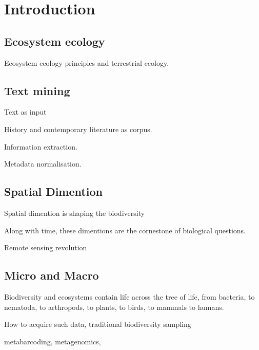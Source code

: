% 
% 


\chapter{Introduction}
\label{cha:intro}



\section{Ecosystem ecology}
\label{sec:intro-ecosystem}

Ecosystem ecology principles \citep{Chapin_Matson_Vitousek_2011} and terrestrial
ecology. 

\section{Text mining}
\label{sec:text-mining}

Text as input

History and contemporary literature as corpus. 

Information extraction. 

Metadata normalisation.



\section{Spatial Dimention}
\label{sec:crete-spatial}

Spatial dimention is shaping the biodiversity

Along with time, these dimentions are the cornestone of 
biological questions. 


Remote sensing revolution

\section{Micro and Macro}
\label{sec:crete-micro-macro}

Biodiversity and ecosystems contain life across the tree of life, from
bacteria, to nematoda, to arthropods, to plants, to birds, to mammals to 
humans. 

How to acquire such data, traditional biodiversity sampling 

metabarcoding, 
metagenomics,

